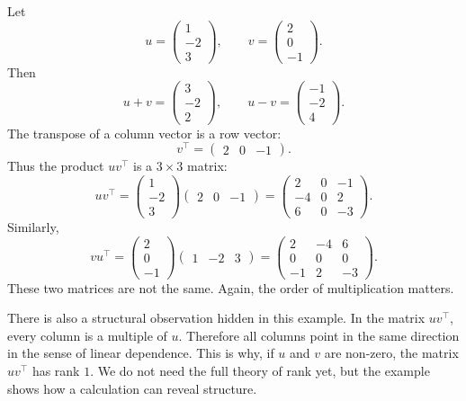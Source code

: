 Let
\[
u=\begin{pmatrix}1\\ -2\\ 3\end{pmatrix},
\qquad
v=\begin{pmatrix}2\\ 0\\ -1\end{pmatrix}.
\]
Then
\[
u+v=
\begin{pmatrix}3\\ -2\\ 2\end{pmatrix},
\qquad
u-v=
\begin{pmatrix}-1\\ -2\\ 4\end{pmatrix}.
\]
The transpose of a column vector is a row vector:
\[
v^{\top}=\begin{pmatrix}2 & 0 & -1\end{pmatrix}.
\]
Thus the product \(uv^{\top}\) is a \(3\times 3\) matrix:
\[
uv^{\top}
=
\begin{pmatrix}1\\ -2\\ 3\end{pmatrix}
\begin{pmatrix}2 & 0 & -1\end{pmatrix}
=
\begin{pmatrix}
2 & 0 & -1\\
-4 & 0 & 2\\
6 & 0 & -3
\end{pmatrix}.
\]
Similarly,
\[
vu^{\top}
=
\begin{pmatrix}2\\ 0\\ -1\end{pmatrix}
\begin{pmatrix}1 & -2 & 3\end{pmatrix}
=
\begin{pmatrix}
2 & -4 & 6\\
0 & 0 & 0\\
-1 & 2 & -3
\end{pmatrix}.
\]
These two matrices are not the same. Again, the order of multiplication matters.

There is also a structural observation hidden in this example. In the matrix \(uv^{\top}\), every column is a multiple of \(u\). Therefore all columns point in the same direction in the sense of linear dependence. This is why, if \(u\) and \(v\) are non-zero, the matrix \(uv^{\top}\) has rank \(1\). We do not need the full theory of rank yet, but the example shows how a calculation can reveal structure.

